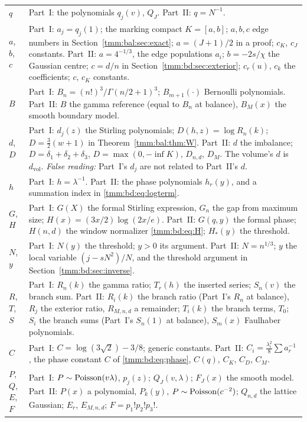 \documentclass[11pt,letterpaper]{article}
\theoremstyle{remark}\newtheorem{remark}[theorem]{Remark}
\newcommand{\vol}{\mathrm{vol}}
\begin{document}
\begin{longtable}{@{}>{\raggedright\arraybackslash}p{} >{\raggedright\arraybackslash}p{}@{}}
$q$ & Part~I: the polynomials $q_j(v)$, $Q_J$. Part~II: $q=N^{-1}$.\\
$a$, $b$, $c$ & Part~I: $a_j=q_j(1)$; the marking compact $K=[a,b]$; $a,b,c$ edge numbers in Section~\ref{tmm:bal:sec:exact}; $a=(J+1)/2$ in a proof; $c_K$, $c_J$ constants. Part~II: $a=4^{-1/3}$, the edge populations $a_i$; $b=-2s/\chi$ the Gaussian centre; $c=d/n$ in Section~\ref{tmm:bd:sec:exterior}; $c_r(u)$, $c_k$ the coefficients; $c$, $c_K$ constants.\\
$B$ & Part~I: $B_n=(n!)^3/\Gamma(n/2+1)^3$; $B_{m+1}(\cdot)$ Bernoulli polynomials. Part~II: $B$ the gamma reference (equal to $B_n$ at balance), $B_M(x)$ the smooth boundary model.\\
$d$, $D$ & Part~I: $d_j(z)$ the Stirling polynomials; $D(h,z)=\log R_n(k)$; $D=\frac32(w+1)$ in Theorem~\ref{tmm:bal:thm:W}. Part~II: $d$ the imbalance; $D=\delta_1+\delta_2+\delta_3$, $D=\max(0,-\inf K)$, $D_{n,d}$, $D_M$. The volume's $d$ is $d_\vol$. \emph{False reading:} Part~I's $d_j$ are not related to Part~II's $d$.\\
$h$ & Part~I: $h=\lambda^{-1}$. Part~II: the phase polynomials $h_r(y)$, and a summation index in \eqref{tmm:bd:eq:logterm}.\\
$G$, $H$ & Part~I: $G(X)$ the formal Stirling expression, $G_n$ the gap from maximum size; $H(x)=(3x/2)\log(2x/e)$. Part~II: $G(q,y)$ the formal phase; $H(n,d)$ the window normalizer \eqref{tmm:bd:eq:H}; $H_*(y)$ the threshold.\\
$N$, $y$ & Part~I: $N(y)$ the threshold; $y>0$ its argument. Part~II: $N=n^{1/3}$; $y$ the local variable $(j-sN^2)/N$, and the threshold argument in Section~\ref{tmm:bd:sec:inverse}.\\
$R$, $T$, $S$ & Part~I: $R_n(k)$ the gamma ratio; $T_r(h)$ the inserted series; $S_n(v)$ the branch sum. Part~II: $R_i(k)$ the branch ratio (Part~I's $R_n$ at balance), $R_j$ the exterior ratio, $R_{M,n,d}$ a remainder; $T_i(k)$ the branch terms, $T_0$; $S_i$ the branch sums (Part~I's $S_n(1)$ at balance), $S_m(x)$ Faulhaber polynomials.\\
$C$ & Part~I: $C=\log(3\sqrt2)-3/8$; generic constants. Part~II: $C_i=\frac{\lambda_i^2}8\sum a_r^{-1}$, the phase constant $C$ of \eqref{tmm:bd:eq:phase}, $C(q)$, $C_K$, $C_D$, $C_M$.\\
$P$, $Q$, $E$, $F$ & Part~I: $P\sim\operatorname{Poisson}(v\lambda)$, $p_j(z)$; $Q_J(v,\lambda)$; $F_J(x)$ the smooth model. Part~II: $P(x)$ a polynomial, $P_k(y)$, $P\sim\operatorname{Poisson}(c^{-2})$; $Q_{n,d}$ the lattice Gaussian; $E_r$, $E_{M,n,d}$; $F=p_1!p_2!p_3!$.\\

\end{longtable}
\end{document}
